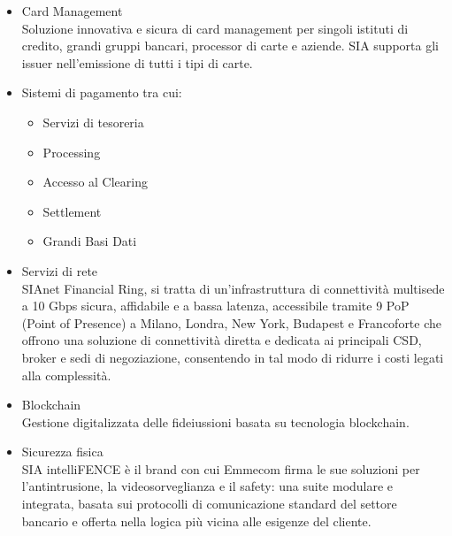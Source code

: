 \begin{itemize}
    \item Card Management \\
    Soluzione innovativa e sicura di card management per singoli istituti di credito, grandi gruppi bancari, processor di carte e aziende. SIA supporta gli issuer nell’emissione di tutti i tipi di carte.
    
    \item Sistemi di pagamento tra cui:
    \begin{itemize}
        \item Servizi di tesoreria 
        \item Processing
        \item Accesso al Clearing
        \item Settlement
        \item Grandi Basi Dati
    \end{itemize}
    
    \item Servizi di rete \\
    SIAnet Financial Ring, si tratta di un'infrastruttura di connettività multisede a 10 Gbps sicura, affidabile e a bassa latenza, accessibile tramite 9 PoP (Point of Presence) a Milano, Londra, New York, Budapest e Francoforte che offrono una soluzione di connettività diretta e dedicata ai principali CSD, broker e sedi di negoziazione, consentendo in tal modo di ridurre i costi legati alla complessità.
    
    
    \item Blockchain \\
    Gestione digitalizzata delle fideiussioni basata su tecnologia blockchain.
    
    \item Sicurezza fisica \\
    SIA intelliFENCE è il brand con cui Emmecom firma le sue soluzioni per l’antintrusione, la videosorveglianza e il safety: una suite modulare e integrata, basata sui protocolli di comunicazione standard del settore bancario e offerta nella logica più vicina alle esigenze del cliente.
\end{itemize}


















